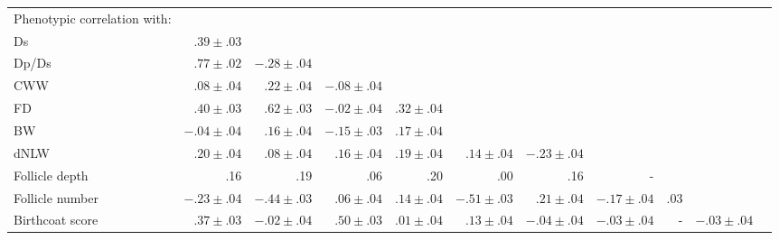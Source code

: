\begin{landscape}
\begin{table}
\begin{tabular}{l|rrrrrrrrrr|}
Phenotypic correlation with: & & & & & & & & & & \\
    Ds            &   $.39\pm.03$ & & & & & & & & & \\
    Dp/Ds         &   $.77\pm.02$ & $-.28\pm.04$ & & & & & & & & \\
    CWW           &   $.08\pm.04$ & $.22\pm.04$  & $-.08\pm.04$ & & & & & & &\\
    FD            &   $.40\pm.03$ & $.62\pm.03$  & $-.02\pm.04$ & $.32\pm.04$ & & & & & & \\
    BW            &  $-.04\pm.04$ & $.16\pm.04$  & $-.15\pm.03$ & $.17\pm.04$ & & & & & & \\
    dNLW          &   $.20\pm.04$ & $.08\pm.04$  & $.16\pm.04$  & $.19\pm.04$ & $.14\pm.04$ &  $-.23\pm.04$  & & & &\\
    Follicle depth \footnotemark[1] &   .16  &  .19   &   .06  &   .20  &    .00  &    .16   &   - & & & \\
    Follicle number &  $-.23\pm.0$4 & $-.44\pm.03$ &   $.06\pm.04$ & $.14\pm.04$  & $-.51\pm.03$  &  $.21\pm.04$ & $-.17\pm.04$ & $.03$ & &  \\
    Birthcoat score & $.37\pm.03$ & $-.02\pm.04$  &    $.50\pm.03$ & $.01\pm.04$  & $.13\pm.04$   & $-.04\pm.04$ & $-.03\pm.04$    & -  &  $-.03\pm.04$ & \\ \hline

\end{tabular}
\vspace{0.1in}
\normalsize
\end{table}
\end{landscape}

%
